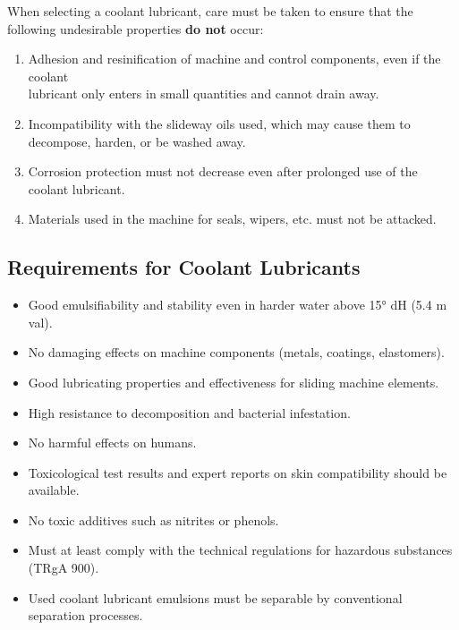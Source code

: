 When selecting a coolant lubricant, care must be taken to ensure that the following undesirable properties \textbf{do not} occur:

\begin{enumerate}
    \item Adhesion and resinification of machine and control components, even if the coolant \\lubricant only enters in small quantities and cannot drain away.
    \item Incompatibility with the slideway oils used, which may cause them to decompose, harden, or be washed away.
    \item Corrosion protection must not decrease even after prolonged use of the coolant lubricant.
    \item Materials used in the machine for seals, wipers, etc. must not be attacked.
\end{enumerate}

\subsection*{Requirements for Coolant Lubricants\footnotemark[2]}

\begin{itemize}
    \item Good emulsifiability and stability even in harder water above 15° dH (5.4 m val).
    \item No damaging effects on machine components (metals, coatings, elastomers).
    \item Good lubricating properties and effectiveness for sliding machine elements.
    \item High resistance to decomposition and bacterial infestation.
    \item No harmful effects on humans.
    \item Toxicological test results and expert reports on skin compatibility should be available.
    \item No toxic additives such as nitrites or phenols.
    \item Must at least comply with the technical regulations for hazardous substances (TRgA 900).
    \item Used coolant lubricant emulsions must be separable by conventional separation processes.
\end{itemize}


